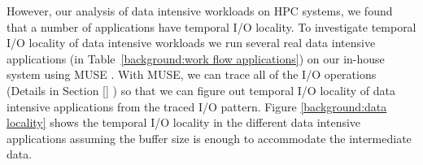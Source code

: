 However, our analysis of data intensive workloads on HPC systems, we found that
a number of applications have temporal I/O locality.
To investigate temporal
I/O locality of data intensive workloads we run several real data intensive
applications (in Table~\ref{background:work flow applications}) on our in-house
system using MUSE \cite{MUSE}.
With MUSE, we can trace all of the I/O operations (Details in Section \ref{}
) so that we can figure out temporal I/O locality of
 data intensive applications from the traced I/O pattern.
Figure \ref{background:data locality} shows the temporal I/O locality in
the different data intensive applications assuming the buffer size is
enough to accommodate the intermediate data.
